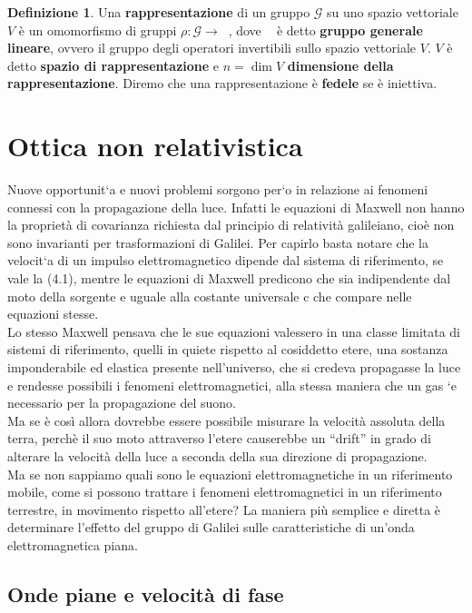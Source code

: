 \documentclass[a4paper,11pt]{book}
\theoremstyle{plain}
\theoremstyle{definition}
\newtheorem{defn}{Definizione}[chapter]
\DeclareMathOperator*{\gl}{GL(V)}
\begin{document}
\begin{defn}
Una \textbf{rappresentazione} di un gruppo $\mathcal{G}$ su uno spazio vettoriale $V$ è un omomorfismo di gruppi $\rho:\mathcal{G}\to\gl$, dove $\gl$ è detto \textbf{gruppo generale lineare}, ovvero il gruppo degli operatori invertibili sullo spazio vettoriale $V$. $V$ è detto \textbf{spazio di rappresentazione} e $n=\dim V$ \textbf{dimensione della rappresentazione}. Diremo che una rappresentazione è \textbf{fedele} se è iniettiva. 
\end{defn}

\section{Ottica non relativistica}
Nuove opportunit`a e nuovi problemi sorgono per`o in relazione ai fenomeni connessi con 
la propagazione della luce. Infatti le equazioni di Maxwell non hanno la proprietà di 
covarianza richiesta dal principio di relatività galileiano, cioè non sono invarianti per 
trasformazioni di Galilei. Per capirlo basta notare che la velocit`a di un impulso elettromagnetico dipende dal sistema di riferimento, se vale la (4.1), mentre le equazioni di 
Maxwell predicono che sia indipendente dal moto della sorgente e uguale alla costante 
universale c che compare nelle equazioni stesse. \\
Lo stesso Maxwell pensava che le sue equazioni valessero in una classe limitata di sistemi 
di riferimento, quelli in quiete rispetto al cosiddetto etere, una sostanza imponderabile 
ed elastica presente nell'universo, che si credeva propagasse la luce e rendesse possibili i 
fenomeni elettromagnetici, alla stessa maniera che un gas `e necessario per la propagazione 
del suono. \\
Ma se è così allora dovrebbe essere possibile misurare la velocità assoluta della terra, 
perchè il suo moto attraverso l'etere causerebbe un “drift” in grado di alterare la velocità 
della luce a seconda della sua direzione di propagazione. \\
Ma se non sappiamo quali sono le equazioni elettromagnetiche in un riferimento mobile, 
come si possono trattare i fenomeni elettromagnetici in un riferimento terrestre, in movimento rispetto all'etere? La maniera più semplice e diretta è determinare l'effetto del 
gruppo di Galilei sulle caratteristiche di un'onda elettromagnetica piana. 

\newpage

\subsection{Onde piane e velocità di fase}
\end{document}
